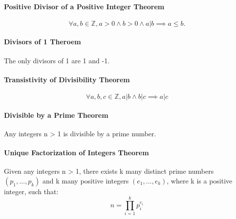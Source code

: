 \paragraph*{Positive Divisor of a Positive Integer Theorem}
\begin{equation*}
    \forall a,b \in \mathbb{Z}, a>0 \land b>0 \land a|b \implies a \leq b.
\end{equation*}

\paragraph*{Divisors of 1 Theroem}
The only divisors of 1 are 1 and -1.

\paragraph*{Transistivity of Divisibility Theorem}
\begin{equation*}
    \forall a,b,c \in \mathbb{Z}, a|b \land b|c \implies a|c
\end{equation*}

\paragraph*{Divisible by a Prime Theorem}
Any integers n > 1 is divisible by a prime number.

\paragraph*{Unique Factorization of Integers Theorem}
Given any integers n > 1, there exists k many distinct prime numbers $(p_1, \dots, p_k)$ and k many positive integers 
$(e_1, \dots, e_k)$, where k is a positive integer, such that:
\begin{equation*}
    n = \prod_{i=1}^k p_i^{e_i}
\end{equation*}